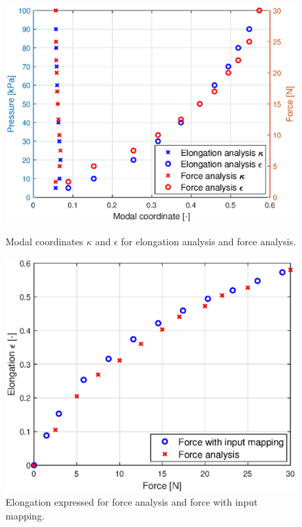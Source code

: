 \begin{figure}[H]
    \centering
\begin{minipage}{0.5\textwidth}
        \centering
        \includegraphics[width=\textwidth]{Figures/Chapter3/forcepressuremodal.eps}
        \caption{Modal coordinates $\kappa$ and $\epsilon$ for elongation analysis and force analysis.}
        \label{fig3:forcemap}
    \end{minipage}\hfill
    \begin{minipage}{0.5\textwidth}
        \centering
        \includegraphics[width=\textwidth]{Figures/Chapter3/pressureforceelongation.eps} 
        \caption{Elongation expressed for force analysis and force with input mapping.}
        \label{fig3:forcetopressure}
    \end{minipage}
\end{figure}

